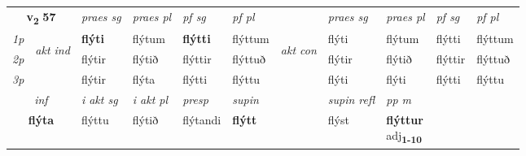 \noindent
\begin{tabular}{lllllllllll} \toprule
\multicolumn{2}{c}{\textbf{v{\textsubscript{2}}} \Large{\textbf{57}}}  &  \textit{praes sg}  & \textit{praes pl}  &\textit{ pf sg} & \textit{pf pl} &  &  \textit{praes sg}  & \textit{praes pl}  & \textit{pf sg} & \textit{pf pl } \\*
	\cmidrule{3-6} \cmidrule{8-11}
 {\textit{1p}} & \multirow{3}{*}{\begin{turn}{90}\textit{akt ind}\end{turn}} & \textbf{flýti} & flýtum & \textbf{flýtti} & flýttum & \multirow{3}{*}{\begin{turn}{90}\textit{akt con}\end{turn}} &flýti & flýtum & flýtti & flýttum\\*
 {\textit{2p}} &  &  flýtir  & flýtið & flýttir & flýttuð & & flýtir & flýtið & flýttir & flýttuð \\*
{\textit{3p}} &  & flýtir & flýta & flýtti & flýttu & & flýti & flýti& flýtti & flýttu \\*
\cmidrule{3-6} \cmidrule{8-11}

   \multicolumn{2}{c}{\textit{inf}}  & \textit{i akt sg} & \textit{i akt pl}   & \textit{presp} & \textit{supin} && \textit{supin refl} & \textit{pp m} \\*
  \multicolumn{2}{c}{\textbf{flýta}} & flýttu  & flýtið   & flýtandi &  \textbf{flýtt} && flýst & \specialcell{\textbf{flýttur} \\ adj\textbf{\textsubscript{1-10}}} \\*
\end{tabular}


